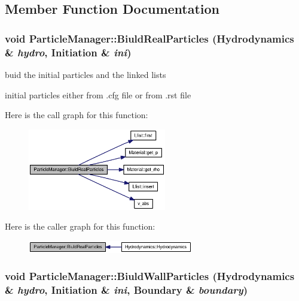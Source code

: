 \subsection{Member Function Documentation}
\hypertarget{classParticleManager_6ee12c3925f371782800a50b17ac0941}{
\subsubsection[{BiuldRealParticles}]{\setlength{\rightskip}{0pt plus 5cm}void ParticleManager::BiuldRealParticles ({\bf Hydrodynamics} \& {\em hydro}, \/  {\bf Initiation} \& {\em ini})}}
\label{classParticleManager_6ee12c3925f371782800a50b17ac0941}


buid the initial particles and the linked lists 



initial particles either from .cfg file or from .rst file 

Here is the call graph for this function:\nopagebreak
\begin{figure}[H]
\begin{center}
\leavevmode
\includegraphics[width=171pt]{classParticleManager_6ee12c3925f371782800a50b17ac0941_cgraph}
\end{center}
\end{figure}


Here is the caller graph for this function:\nopagebreak
\begin{figure}[H]
\begin{center}
\leavevmode
\includegraphics[width=205pt]{classParticleManager_6ee12c3925f371782800a50b17ac0941_icgraph}
\end{center}
\end{figure}
\hypertarget{classParticleManager_edebb3e37b06426f6509b35c0926bd59}{
\subsubsection[{BiuldWallParticles}]{\setlength{\rightskip}{0pt plus 5cm}void ParticleManager::BiuldWallParticles ({\bf Hydrodynamics} \& {\em hydro}, \/  {\bf Initiation} \& {\em ini}, \/  {\bf Boundary} \& {\em boundary})}}
\label{classParticleManager_edebb3e37b06426f6509b35c0926bd59}


